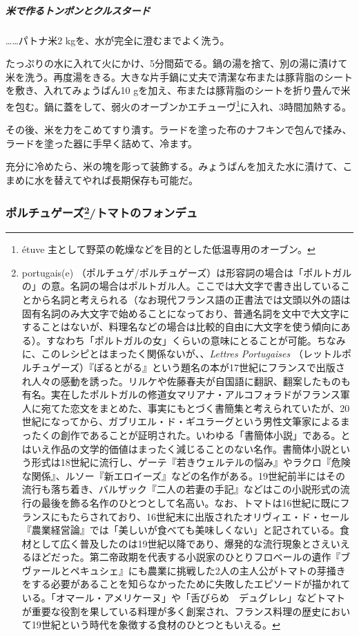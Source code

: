 \begin{recette}
\hypertarget{ux7c73ux3067ux4f5cux308bux30c8ux30f3ux30ddux30f3ux3068ux30afux30ebux30b9ux30bfux30fcux30c9}{%
\subparagraph{米で作るトンポンとクルスタード}\label{ux7c73ux3067ux4f5cux308bux30c8ux30f3ux30ddux30f3ux3068ux30afux30ebux30b9ux30bfux30fcux30c9}}

\ldots{}\ldots{}パトナ米2 kgを、水が完全に澄むまでよく洗う。

たっぷりの水に入れて火にかけ、5分間茹でる。鍋の湯を捨て、別の湯に漬けて米を洗う。再度湯をきる。大きな片手鍋に丈夫で清潔な布または豚背脂のシートを敷き、入れてみょうばん10
gを加え、布または豚背脂のシートを折り畳んで米を包む。鍋に蓋をして、弱火のオーブンかエチューヴ\footnote{étuve
  主として野菜の乾燥などを目的とした低温専用のオーブン。}に入れ、3時間加熱する。

その後、米を力をこめてすり潰す。ラードを塗った布のナフキンで包んで揉み、ラードを塗った器に手早く詰めて、冷ます。

充分に冷めたら、米の塊を彫って装飾する。みょうばんを加えた水に漬けて、こまめに水を替えてやれば長期保存も可能だ。

\hypertarget{portugaise}{%
\subsubsection[ポルチュゲーズ/トマトのフォンデュ]{\texorpdfstring{ポルチュゲーズ\footnote{portugais(e)
  （ポルチュゲ/ポルチュゲーズ）は形容詞の場合は「ポルトガルの」の意。名詞の場合はポルトガル人。ここでは大文字で書き出していることから名詞と考えられる（なお現代フランス語の正書法では文頭以外の語は固有名詞のみ大文字で始めることになっており、普通名詞を文中で大文字にすることはないが、料理名などの場合は比較的自由に大文字を使う傾向にある）。すなわち「ポルトガルの女」くらいの意味にとることが可能。ちなみに、このレシピとはまったく関係ないが、、\emph{Lettres
  Portugaises}
  （レットルポルチュゲーズ）『ぽるとがる』という題名の本が17世紀にフランスで出版され人々の感動を誘った。リルケや佐藤春夫が自国語に翻訳、翻案したものも有名。実在したポルトガルの修道女マリアナ・アルコフォラドがフランス軍人に宛てた恋文をまとめた、事実にもとづく書簡集と考えられていたが、20世紀になってから、ガブリエル・ド・ギユラーグという男性文筆家によるまったくの創作であることが証明された。いわゆる「書簡体小説」である。とはいえ作品の文学的価値はまったく減じることのない名作。書簡体小説という形式は18世紀に流行し、ゲーテ『若きウェルテルの悩み』やラクロ『危険な関係』、ルソー『新エロイーズ』などの名作がある。19世紀前半にはその流行も落ち着き、バルザック『二人の若妻の手記』などはこの小説形式の流行の最後を飾る名作のひとつとして名高い。なお、トマトは16世紀に既にフランスにもたらされており、16世紀末に出版されたオリヴィエ・ド・セール『農業経営論』では「美しいが食べても美味しくない」と記されている。食材として広く普及したのは19世紀以降であり、爆発的な流行現象とさえいえるほどだった。第二帝政期を代表する小説家のひとりフロベールの遺作『ブヴァールとペキュシェ』にも農業に挑戦した2人の主人公がトマトの芽掻きをする必要があることを知らなかったために失敗したエピソードが描かれている。「オマール・アメリケーヌ」や「舌びらめ　デュグレレ」などトマトが重要な役割を果している料理が多く創案され、フランス料理の歴史において19世紀という時代を象徴する食材のひとつともいえる。}/トマトのフォンデュ}{ポルチュゲーズ/トマトのフォンデュ}}\label{portugaise}}


\end{recette}
